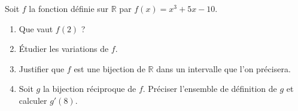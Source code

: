 
\begin{exercice}\label{exoanalyseCTU-0010}

Soit $f$ la fonction définie sur $\mathbb{R}$ par $f(x)=x^3+5x-10$.
\begin{enumerate}
    \item Que vaut \( f(2)\) ?
\item Étudier les variations de $f$.
\item Justifier que $f$ est une bijection de  $\mathbb{R}$ dans un intervalle que l'on précisera. 
\item Soit $g$ la bijection réciproque de $f$. Préciser l'ensemble de définition de $g$ et calculer $g'(8)$.
\end{enumerate}


\end{exercice}
